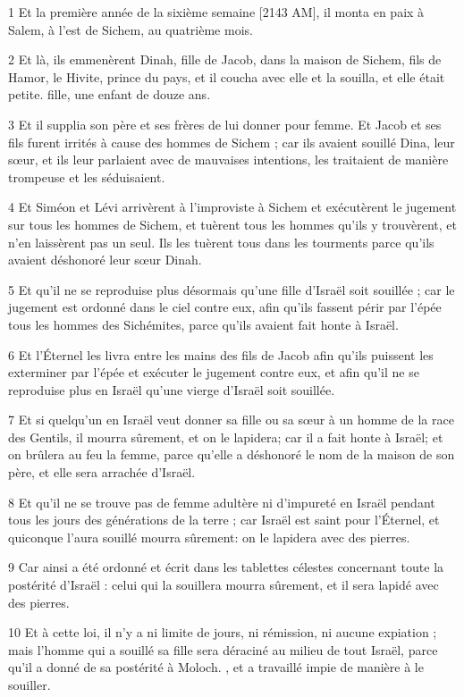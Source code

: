 \par 1 Et la première année de la sixième semaine [2143 AM], il monta en paix à Salem, à l'est de Sichem, au quatrième mois.
\par 2 Et là, ils emmenèrent Dinah, fille de Jacob, dans la maison de Sichem, fils de Hamor, le Hivite, prince du pays, et il coucha avec elle et la souilla, et elle était petite. fille, une enfant de douze ans.
\par 3 Et il supplia son père et ses frères de lui donner pour femme. Et Jacob et ses fils furent irrités à cause des hommes de Sichem ; car ils avaient souillé Dina, leur sœur, et ils leur parlaient avec de mauvaises intentions, les traitaient de manière trompeuse et les séduisaient.
\par 4 Et Siméon et Lévi arrivèrent à l'improviste à Sichem et exécutèrent le jugement sur tous les hommes de Sichem, et tuèrent tous les hommes qu'ils y trouvèrent, et n'en laissèrent pas un seul. Ils les tuèrent tous dans les tourments parce qu'ils avaient déshonoré leur sœur Dinah.
\par 5 Et qu'il ne se reproduise plus désormais qu'une fille d'Israël soit souillée ; car le jugement est ordonné dans le ciel contre eux, afin qu'ils fassent périr par l'épée tous les hommes des Sichémites, parce qu'ils avaient fait honte à Israël.
\par 6 Et l'Éternel les livra entre les mains des fils de Jacob afin qu'ils puissent les exterminer par l'épée et exécuter le jugement contre eux, et afin qu'il ne se reproduise plus en Israël qu'une vierge d'Israël soit souillée.
\par 7 Et si quelqu'un en Israël veut donner sa fille ou sa sœur à un homme de la race des Gentils, il mourra sûrement, et on le lapidera; car il a fait honte à Israël; et on brûlera au feu la femme, parce qu'elle a déshonoré le nom de la maison de son père, et elle sera arrachée d'Israël.
\par 8 Et qu'il ne se trouve pas de femme adultère ni d'impureté en Israël pendant tous les jours des générations de la terre ; car Israël est saint pour l'Éternel, et quiconque l'aura souillé mourra sûrement: on le lapidera avec des pierres.
\par 9 Car ainsi a été ordonné et écrit dans les tablettes célestes concernant toute la postérité d'Israël : celui qui la souillera mourra sûrement, et il sera lapidé avec des pierres.
\par 10 Et à cette loi, il n'y a ni limite de jours, ni rémission, ni aucune expiation ; mais l'homme qui a souillé sa fille sera déraciné au milieu de tout Israël, parce qu'il a donné de sa postérité à Moloch. , et a travaillé impie de manière à le souiller.

